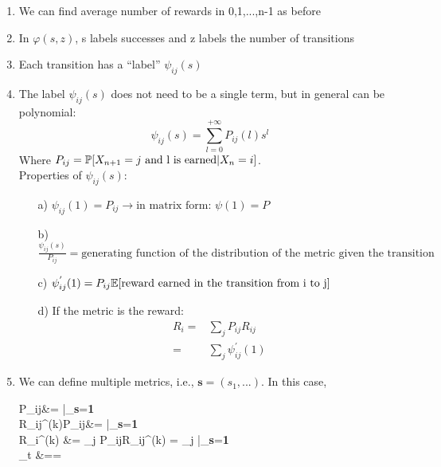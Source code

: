 \begin{enumerate}
	\item We can find average number of rewards in 0,1,...,n-1 as before
	\item In $\varphi(s,z)$, s labels successes and z labels the number of transitions
	\item Each transition has a ``label'' $\psi_{ij}(s)$
	\item The label $\psi_{ij}(s)$ does not need to be a single term, but in general can be polynomial: $$\psi_{ij}(s) = \sum\limits_{l=0}^{+\infty} P_{ij}(l)s^l$$
				Where $P_{ij} = \mathbb{P}[X_{n+1}=j\text{ and l is earned}| X_n = i]$.\\
				Properties of $\psi_{ij}(s)$:
				\begin{itemize}
					\item[a)] $\psi_{ij}(1)=P_{ij} \rightarrow \text{in matrix form: } \psi(1) = P$
					\item[b)] $\frac{\psi_{ij}(s)}{P_{ij}}=\text{generating function of the distribution of the metric given the transition}$
					\item[c)] $\psi_{ij}^{'}(1)=P_{ij}\mathbb{E}[\text{reward earned in the transition from i to j}] $
					\item[d)] If the metric is the reward:
								\begin{equation}
									\begin{split}
										R_i =& \sum_j P_{ij}R_{ij} \\
										    =& \sum_j \psi_{ij}^{'}(1)
									\end{split}
								\end{equation}
				\end{itemize}
	\item We can define multiple metrics, i.e., $\textbf{s} = (s_1,...)$. In this case,
		\begin{esp}
			P_{ij}\cdot& = \bigg|_{\textbf{s}=\textbf{1}}\\
			R_{ij}^{(k)}P_{ij}&=  \bigg|_{\textbf{s}=\textbf{1}}\\
			R_i^{(k)} &= \sum_j P_{ij}R_{ij}^{(k)} = \sum_j \bigg|_{\textbf{s}=\textbf{1}}\\
			\lim_{t \to \infty}&== 

\end{esp}
\end{enumerate}
